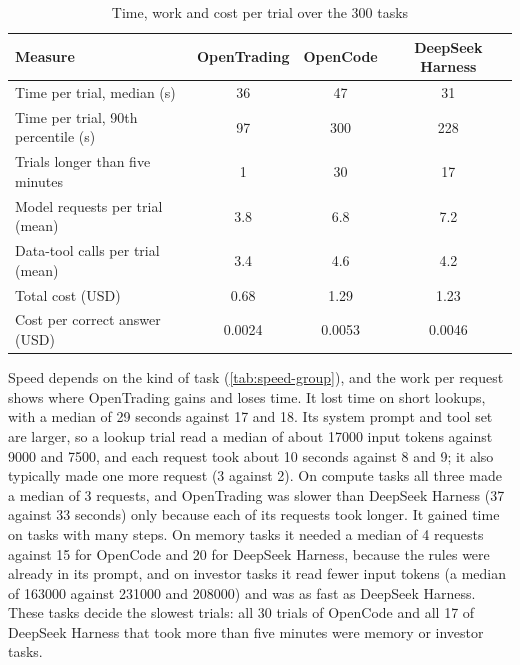 \begin{table}[H]
  \centering
  \caption{Time, work and cost per trial over the 300 tasks}\label{tab:speed}
  \begin{tabularx}{\textwidth}{@{}L *{3}{S[table-format=3.4, table-alignment-mode=none, group-digits=integer]}@{}}
    \toprule
    {Measure} & {OpenTrading} & {OpenCode} & {DeepSeek Harness}\\
    \midrule
    Time per trial, median (s) & 36 & 47 & 31\\
    Time per trial, 90th percentile (s) & 97 & 300 & 228\\
    Trials longer than five minutes & 1 & 30 & 17\\
    Model requests per trial (mean) & 3.8 & 6.8 & 7.2\\
    Data-tool calls per trial (mean) & 3.4 & 4.6 & 4.2\\
    Total cost (USD) & 0.68 & 1.29 & 1.23\\
    Cost per correct answer (USD) & 0.0024 & 0.0053 & 0.0046\\
    \bottomrule
  \end{tabularx}
\end{table}

Speed depends on the kind of task (\cref{tab:speed-group}), and the work per request shows where OpenTrading gains and loses time.
It lost time on short lookups, with a median of 29 seconds against 17 and 18.
Its system prompt and tool set are larger, so a lookup trial read a median of about \num{17000} input tokens against \num{9000} and \num{7500}, and each request took about 10 seconds against 8 and 9; it also typically made one more request (3 against 2).
On compute tasks all three made a median of 3 requests, and OpenTrading was slower than DeepSeek Harness (37 against 33 seconds) only because each of its requests took longer.
It gained time on tasks with many steps.
On memory tasks it needed a median of 4 requests against 15 for OpenCode and 20 for DeepSeek Harness, because the rules were already in its prompt, and on investor tasks it read fewer input tokens (a median of \num{163000} against \num{231000} and \num{208000}) and was as fast as DeepSeek Harness.
These tasks decide the slowest trials: all 30 trials of OpenCode and all 17 of DeepSeek Harness that took more than five minutes were memory or investor tasks.

